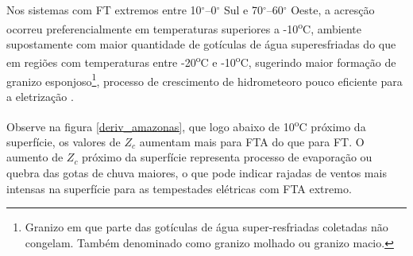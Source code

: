 Nos sistemas com FT extremos entre 10$^{\circ}$--0$^{\circ}$ Sul e 70$^{\circ}$--60$^{\circ}$ Oeste, a acresção ocorreu preferencialmente em temperaturas superiores a -10\textsuperscript{o}C, ambiente supostamente com maior quantidade de gotículas de água superesfriadas do que em regiões com temperaturas entre -20\textsuperscript{o}C e -10\textsuperscript{o}C, sugerindo maior formação de granizo esponjoso\footnote{Granizo em que parte das gotículas de água super-resfriadas coletadas não congelam. Também denominado como granizo molhado ou granizo macio.}, processo de crescimento de hidrometeoro pouco eficiente para a eletrização \cite{jayaratne1983}. 



Observe na figura \ref{deriv_amazonas}, que logo abaixo de 10\textsuperscript{o}C próximo da superfície, os valores de $Z_c$ aumentam mais para FTA do que para FT. O aumento de $Z_c$ próximo da superfície representa processo de evaporação ou quebra das gotas de chuva maiores, o que pode indicar rajadas de ventos mais intensas na superfície para as tempestades elétricas com FTA extremo. 




